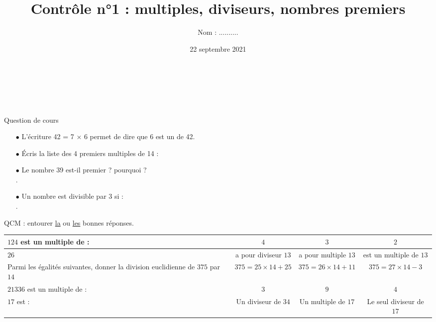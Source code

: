 \documentclass[a4paper]{article}
\title{Contrôle n°1 : multiples, diviseurs, nombres premiers}
\date{22 septembre 2021}
\author{Nom : ..........}
\makeatletter
\renewcommand{\maketitle}{%
    \topskip0pt
	\@author \hfill \@date \\

	\begin{center}
		\begin{huge}
			\@title \\[2em]
		\end{huge}
	\end{center}
}
\makeatother
\begin{document}
\maketitle

\begin{question}[(4 points)] Question de cours \\
	\begin{itemize}
		\setlength\itemsep{0.4em}
		\item[$\bullet$] L’écriture 42 = 7 × 6 permet de dire que 6 est un \dotfill de 42.
		\item[$\bullet$] Écris la liste des 4 premiers multiples de 14 : \dotfill
		\item[$\bullet$] Le nombre 39 est-il premier ? pourquoi ? \dotfill \\[0.5em] .\dotfill
		\item[$\bullet$] Un nombre est divisible par 3 si : \dotfill \\[0.5em] .\dotfill
	\end{itemize}
\end{question}

\begin{question}[(3,5 points)] QCM : entourer \uline{la} ou \uline{les} bonnes réponses.

	\renewcommand{\arraystretch}{1.8}
	\begin{tabular}[t]{|m{3.8cm}|c|c|c|}
		\firsthline
		$124$ est un multiple de :   & $4$                  & $3$                  & $2$                      \\ \hline
		$26$                         & a pour diviseur $13$ & a pour multiple $13$ & est un multiple de $13$  \\ \hline
		Parmi les égalités
		suivantes, donner la
		division euclidienne de
		$375$ par $14$               & $375=25×14 +25$      & $375=26×14+11$       & $375=27×14-3$            \\ \hline
		$21336$ est un multiple de : & $3$                  & $9$                  & $4$                      \\ \hline
		$17$ est :                   & Un diviseur de $34$  & Un multiple de $17$  & Le seul diviseur de $17$ \\ \hline
	\end{tabular}
	\renewcommand{\arraystretch}{1}
\end{question}
\end{document}
